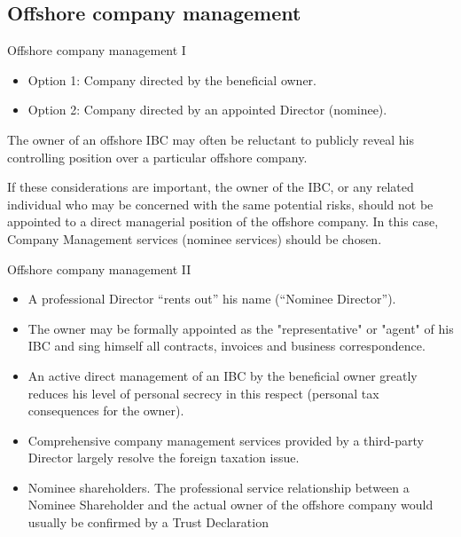 \documentclass[international_finance_p2.tex]{subfiles}
\begin{document}
\subsection{Offshore company management}
\begin{frame}{Offshore company management I}
\begin{itemize}[<+->]
\item
Option 1: Company directed by the beneficial owner. 
\item
Option 2: Company directed by an appointed Director (nominee). 
\end{itemize}
The owner of an offshore IBC may often be reluctant to publicly reveal his controlling position over a particular offshore company. 

If these considerations are important, the owner of the IBC, or any related individual who may be concerned with the same potential risks, should not be appointed to a direct managerial position of the offshore company. In this case, Company Management services (nominee services) should be chosen. 
\end{frame}
\begin{frame}[shrink=10]{Offshore company management II}
\begin{itemize}
\item
A professional Director ``rents out'' his name (``Nominee Director'').
\item
The owner may be formally appointed as the "representative" or "agent" of his IBC and sing himself all contracts, invoices and business correspondence.
\item
An active direct management of an IBC by the beneficial owner greatly reduces his level of personal secrecy in this respect (personal tax consequences for the owner).
\item
Comprehensive company management services provided by a third-party Director largely resolve the foreign taxation issue.
\item
Nominee shareholders. The professional service relationship between a Nominee Shareholder and the actual owner of the offshore company would usually be confirmed by a Trust Declaration
\end{itemize}
\end{frame}
\end{document}
